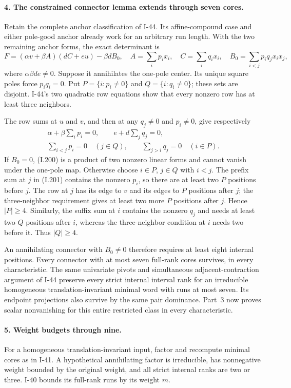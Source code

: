 \paragraph{4. The constrained connector lemma extends through seven cores.}
Retain the complete anchor classification of I-44. Its
affine-compound case and either pole-good anchor already
work for an arbitrary run length. With the two remaining
anchor forms, the exact determinant is
\[
 F=(\alpha v+\beta A)(dC+e u)-\beta dB_0,
 \quad A=\sum_i p_ix_i,\quad C=\sum_i q_ix_i,
 \quad B_0=\sum_{i<j}p_iq_jx_ix_j,
 \tag{I.200}
\]
where $\alpha\beta de\ne0$. Suppose it annihilates the
one-pole center. Its unique square poles force $p_iq_i=0$.
Put $P=\{i:p_i\ne0\}$ and $Q=\{i:q_i\ne0\}$; these
sets are disjoint. I-44's two quadratic row equations show
that every nonzero row has at least three neighbors.

The row sums at $u$ and $v$, and then at any $q_j\ne0$
and $p_i\ne0$, give respectively
\[
 \begin{gathered}
 \alpha+\beta\sum_i p_i=0,\qquad
 e+d\sum_jq_j=0,\\
 \sum_{i<j}p_i=0\quad(j\in Q),\qquad
 \sum_{j>i}q_j=0\quad(i\in P).
 \end{gathered}
 \tag{I.201}
\]
If $B_0=0$, (I.200) is a product of two nonzero linear
forms and cannot vanish under the one-pole map. Otherwise
choose $i\in P$, $j\in Q$ with $i<j$.
The prefix sum at $j$ in (I.201) contains the nonzero
$p_i$, so there are at least two $P$ positions before $j$.
The row at $j$ has its edge to $v$ and its edges to $P$
positions after $j$; the three-neighbor requirement gives
at least two more $P$ positions after $j$. Hence $|P|\ge4$.
Similarly, the suffix sum at $i$ contains the nonzero
$q_j$ and needs at least two $Q$ positions after $i$,
whereas the three-neighbor condition at $i$ needs two
before it. Thus $|Q|\ge4$.

An annihilating connector with $B_0\ne0$ therefore requires
at least eight internal positions. Every connector with
at most seven full-rank cores survives, in every
characteristic. The same univariate pivots and simultaneous
adjacent-contraction argument of I-44 preserve every
strict internal interval rank for an irreducible homogeneous
translation-invariant minimal word with runs at most seven.
Its endpoint projections also survive by the same pair
dominance. Part~3 now proves scalar nonvanishing for this
entire restricted class in every characteristic.

\paragraph{5. Weight budgets through nine.}
For a homogeneous translation-invariant input, factor and
recompute minimal cores as in I-41. A hypothetical
annihilating factor is irreducible, has nonnegative weight
bounded by the original weight, and all strict internal
ranks are two or three. I-40 bounds its full-rank runs by
its weight $m$.

